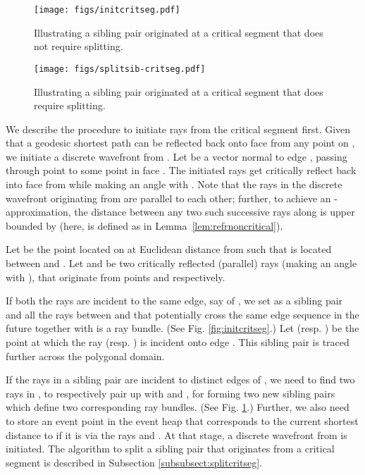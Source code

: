 \documentclass[11pt]{article}
\begin{document}
\begin{figure}[h]
\begin{minipage}[t]{0.49\linewidth}
\begin{center}
\texttt{[image: figs/initcritseg.pdf]}
\caption{\footnotesize Illustrating a sibling pair  originated at a critical segment that does not require splitting.} 
\label{fig:initcritseg}
\end{center}
\end{minipage}
\hspace*{0.04in}
\begin{minipage}[t]{0.49\linewidth}
\begin{center}
\texttt{[image: figs/splitsib-critseg.pdf]}
\caption{\footnotesize Illustrating a sibling pair  originated at a critical segment that does require splitting.} 
\label{fig:splitsib-critseg}
\end{center}
\end{minipage}
\vspace*{-0.1in}
\end{figure}

We describe the procedure to initiate rays from the critical segment  first.
Given that a geodesic shortest path can be reflected back onto face  from any point on , we initiate a discrete wavefront from .
Let  be a vector normal to edge , passing through point  to some point in face .
The initiated rays get critically reflect back into face  from  while making an angle  with .  
Note that the rays in the discrete wavefront originating from  are parallel to each other; further, to achieve an -approximation, the distance between any two such successive rays along  is upper bounded by  (here,  is defined as in Lemma~\ref{lem:refrnoncritical}).

Let  be the point located on  at Euclidean distance   from  such that  is located between  and .
Let  and  be two critically reflected (parallel) rays (making an angle  with ), that originate from points  and  respectively.

If both the rays are incident to the same edge, say  of , we set  as a sibling pair and all the rays between  and  that potentially cross the same edge sequence in the future together with  is a ray bundle. 
(See Fig. \ref{fig:initcritseg}.)
Let  (resp. ) be the point at which the ray  (resp. ) is incident onto edge . 
This sibling pair is traced further across the polygonal domain.

If the rays in a sibling pair  are incident to distinct edges of , we need to find two rays  in , to respectively pair up with  and , for forming two new sibling pairs which define two corresponding ray bundles.
(See Fig. \ref{fig:splitsib-critseg}.)
Further, we also need to store an event point in the event heap that corresponds to the current shortest distance to  if it is via the rays  and . 
At that stage, a discrete wavefront from  is initiated. 
The algorithm to split a sibling pair that originates from a critical segment is described in Subsection \ref{subsubsect:splitcritseg}.
\end{document}
